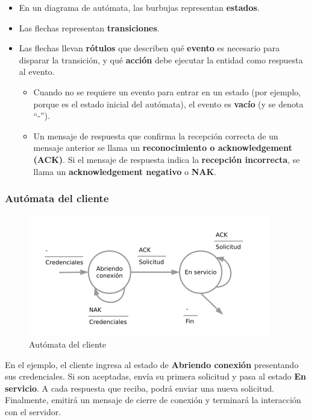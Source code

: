 \documentclass[spanish,A4,]{article}
\begin{document}
\begin{itemize}
\item
  En un diagrama de autómata, las burbujas representan \textbf{estados}.
\item
  Las flechas representan \textbf{transiciones}.
\item
  Las flechas llevan \textbf{rótulos} que describen qué \textbf{evento}
  es necesario para disparar la transición, y qué \textbf{acción} debe
  ejecutar la entidad como respuesta al evento.

  \begin{itemize}
  \itemsep1pt\parskip0pt
  \item
    Cuando no se requiere un evento para entrar en un estado (por
    ejemplo, porque es el estado inicial del autómata), el evento es
    \textbf{vacío} (y se denota ``-'').
  \item
    Un mensaje de respuesta que confirma la recepción correcta de un
    mensaje anterior se llama un \textbf{reconocimiento o
    acknowledgement (ACK)}. Si el mensaje de respuesta indica la
    \textbf{recepción incorrecta}, se llama un \textbf{acknowledgement
    negativo} o \textbf{NAK}.
  \end{itemize}
\end{itemize}

\subsubsection{Autómata del cliente}\label{autuxf3mata-del-cliente}

\begin{figure}[htbp]
\centering
\includegraphics{img/protocolo-cliente.png}
\caption{Autómata del cliente}
\end{figure}

En el ejemplo, el cliente ingresa al estado de \textbf{Abriendo
conexión} presentando sus credenciales. Si son aceptadas, envía su
primera solicitud y pasa al estado \textbf{En servicio}. A cada
respuesta que reciba, podrá enviar una nueva solicitud. Finalmente,
emitirá un mensaje de cierre de conexión y terminará la interacción con
el servidor.
\end{document}

